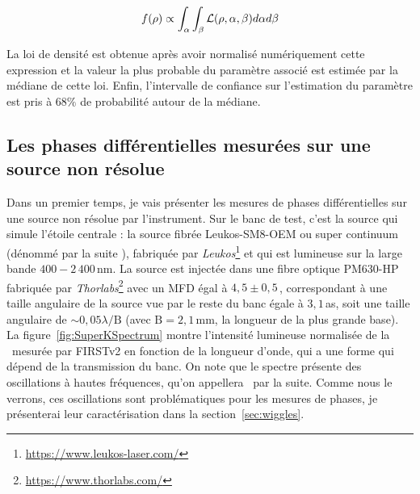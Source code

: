 \begin{equation}
    f (\rho) \propto \int_{\alpha} \int_{\beta} \mathcal{L} (\rho, \alpha, \beta) d\alpha d\beta
\end{equation}

La loi de densité est obtenue après avoir normalisé numériquement cette expression et la valeur la plus probable du paramètre associé est estimée par la médiane de cette loi. Enfin, l'intervalle de confiance sur l'estimation du paramètre est pris à $68 \%$ de probabilité autour de la médiane.


\subsection{Les phases différentielles mesurées sur une source non résolue}

Dans un premier temps, je vais présenter les mesures de phases différentielles sur une source non résolue par l'instrument. Sur le banc de test, c'est la source qui simule l'étoile centrale : la source fibrée Leukos-SM8-OEM ou super continuum (dénommé par la suite \sk), fabriquée par \textit{Leukos}\footnote{\url{https://www.leukos-laser.com/}} et qui est lumineuse sur la large bande $400 - 2\,400 \,$nm. La source est injectée dans une fibre optique PM630-HP fabriquée par \textit{Thorlabs}\footnote{\url{https://www.thorlabs.com/}} avec un \ac{MFD} égal à $4,5 \pm 0,5 \,$\um, correspondant à une taille angulaire de la source vue par le reste du banc égale à $3,1 \,$as, soit une taille angulaire de $\sim 0,05 \lambda / \text{B}$ (avec $\text{B} = 2,1 \,$mm, la longueur de la plus grande base). La figure~\ref{fig:SuperKSpectrum} montre l'intensité lumineuse normalisée de la \sk~mesurée par \ac{FIRSTv2} en fonction de la longueur d'onde, qui a une forme qui dépend de la transmission du banc. On note que le spectre présente des oscillations à hautes fréquences, qu'on appellera \wiggles~par la suite. Comme nous le verrons, ces oscillations sont problématiques pour les mesures de phases, je présenterai leur caractérisation dans la section~\ref{sec:wiggles}.

